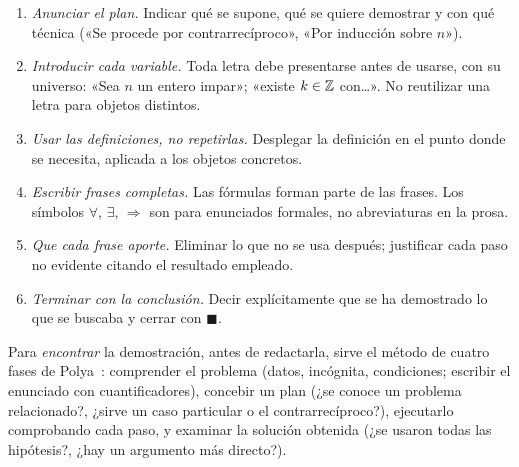 \begin{enumerate}[label=\arabic*.]
  \item \emph{Anunciar el plan.} Indicar qué se supone, qué se quiere demostrar y con qué técnica («Se procede por contrarrecíproco», «Por inducción sobre $n$»).
  \item \emph{Introducir cada variable.} Toda letra debe presentarse antes de usarse, con su universo: «Sea $n$ un entero impar»; «existe $k\in\mathbb{Z}$ con\dots». No reutilizar una letra para objetos distintos.
  \item \emph{Usar las definiciones, no repetirlas.} Desplegar la definición en el punto donde se necesita, aplicada a los objetos concretos.
  \item \emph{Escribir frases completas.} Las fórmulas forman parte de las frases. Los símbolos $\forall$, $\exists$, $\Rightarrow$ son para enunciados formales, no abreviaturas en la prosa.
  \item \emph{Que cada frase aporte.} Eliminar lo que no se usa después; justificar cada paso no evidente citando el resultado empleado.
  \item \emph{Terminar con la conclusión.} Decir explícitamente que se ha demostrado lo que se buscaba y cerrar con $\blacksquare$.
\end{enumerate}

Para \emph{encontrar} la demostración, antes de redactarla, sirve el método de cuatro fases de Polya~\cite{polya}: comprender el problema (datos, incógnita, condiciones; escribir el enunciado con cuantificadores), concebir un plan (¿se conoce un problema relacionado?, ¿sirve un caso particular o el contrarrecíproco?), ejecutarlo comprobando cada paso, y examinar la solución obtenida (¿se usaron todas las hipótesis?, ¿hay un argumento más directo?).

\addtocounter{definicion}{1}%

\addtocounter{definicion}{1}%

\addtocounter{definicion}{1}%

